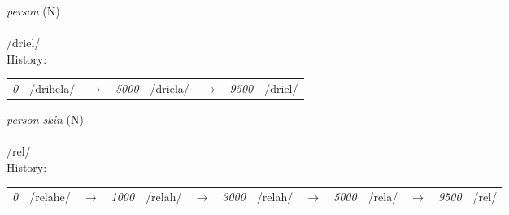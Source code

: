 \vspace{15pt}
\begin{nopagebreak}
 \textit{person} (N)\\
\\
\noindent /dr{\textprimstress}iel/\\


\noindent History:

\vspace{-0pt}
\hspace{40pt}
\begin{tabular}{ccc}
\textit{0} & /drihela/&$\rightarrow$ & \textit{5000} & /driela/&$\rightarrow$ & \textit{9500} & /driel/& \\
\end{tabular}

\vspace{20pt}\hline

\end{nopagebreak}
\filbreak



\vspace{15pt}
\begin{nopagebreak}
 \textit{person skin} (N)\\
\\
\noindent /{}r{\textprimstress}el/\\


\noindent History:

\vspace{-0pt}
\hspace{40pt}
\begin{tabular}{ccc}
\textit{0} & /{}relahe{}/&$\rightarrow$ & \textit{1000} & /{}relah{}/&$\rightarrow$ & \textit{3000} & /{}relah/&$\rightarrow$ & \textit{5000} & /{}rela/&$\rightarrow$ & \textit{9500} & /{}rel/& \\
\end{tabular}

\vspace{20pt}\hline

\end{nopagebreak}
\filbreak




